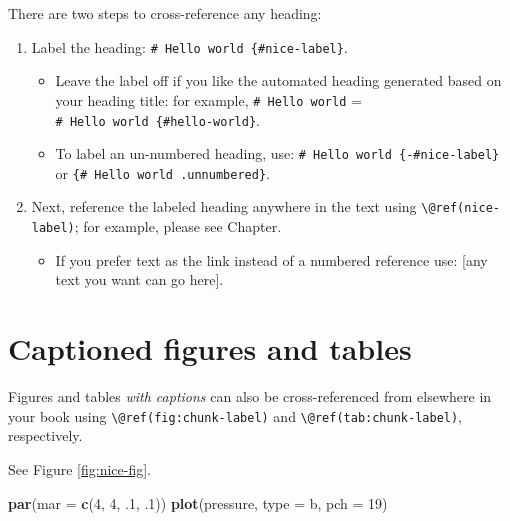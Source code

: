 \documentclass[
]{book}
\newenvironment{Shaded}{\begin{snugshade}}{\end{snugshade}}
\newcommand{\AttributeTok}[1]{\textcolor[rgb]{0.13,0.29,0.53}{#1}}
\newcommand{\DecValTok}[1]{\textcolor[rgb]{0.00,0.00,0.81}{#1}}
\newcommand{\FunctionTok}[1]{\textcolor[rgb]{0.13,0.29,0.53}{\textbf{#1}}}
\newcommand{\NormalTok}[1]{#1}
\newcommand{\StringTok}[1]{\textcolor[rgb]{0.31,0.60,0.02}{#1}}
\providecommand{\tightlist}{%
  \setlength{\itemsep}{0pt}\setlength{\parskip}{0pt}}
\theoremstyle{definition}
\theoremstyle{definition}
\theoremstyle{definition}
\theoremstyle{definition}
\theoremstyle{remark}
\begin{document}
There are two steps to cross-reference any heading:

\begin{enumerate}
\def\labelenumi{\arabic{enumi}.}
\tightlist
\item
  Label the heading: \texttt{\#\ Hello\ world\ \{\#nice-label\}}.

  \begin{itemize}
  \tightlist
  \item
    Leave the label off if you like the automated heading generated based on your heading title: for example, \texttt{\#\ Hello\ world} = \texttt{\#\ Hello\ world\ \{\#hello-world\}}.
  \item
    To label an un-numbered heading, use: \texttt{\#\ Hello\ world\ \{-\#nice-label\}} or \texttt{\{\#\ Hello\ world\ .unnumbered\}}.
  \end{itemize}
\item
  Next, reference the labeled heading anywhere in the text using \texttt{\textbackslash{}@ref(nice-label)}; for example, please see Chapter.

  \begin{itemize}
  \tightlist
  \item
    If you prefer text as the link instead of a numbered reference use: {[}any text you want can go here{]}.
  \end{itemize}
\end{enumerate}

\hypertarget{captioned-figures-and-tables}{%
\section{Captioned figures and tables}\label{captioned-figures-and-tables}}

Figures and tables \emph{with captions} can also be cross-referenced from elsewhere in your book using \texttt{\textbackslash{}@ref(fig:chunk-label)} and \texttt{\textbackslash{}@ref(tab:chunk-label)}, respectively.

See Figure \ref{fig:nice-fig}.

\begin{Shaded}
\begin{Highlighting}[]
\FunctionTok{par}\NormalTok{(}\AttributeTok{mar =} \FunctionTok{c}\NormalTok{(}\DecValTok{4}\NormalTok{, }\DecValTok{4}\NormalTok{, .}\DecValTok{1}\NormalTok{, .}\DecValTok{1}\NormalTok{))}
\FunctionTok{plot}\NormalTok{(pressure, }\AttributeTok{type =} \StringTok{\textquotesingle{}b\textquotesingle{}}\NormalTok{, }\AttributeTok{pch =} \DecValTok{19}\NormalTok{)}
\end{Highlighting}
\end{Shaded}
\end{document}

